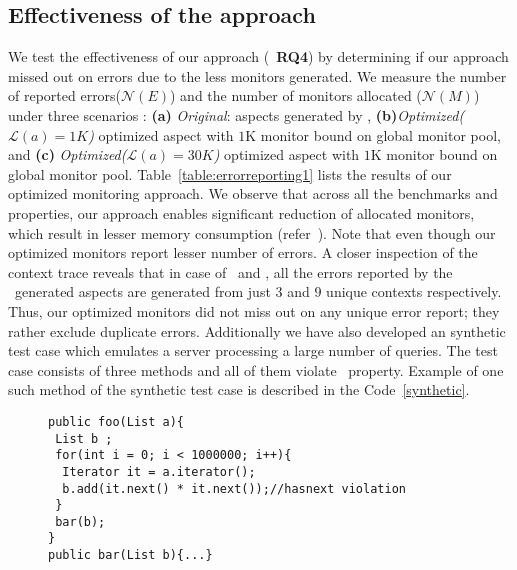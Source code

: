 \subsection{Effectiveness of the approach}
\label{sec:evaluation:effectiveness}


We test the effectiveness of our approach (\ie\ \textbf{RQ4}) by determining 
if our approach missed out on errors due to the less monitors generated. We 
measure the number of reported errors($\mathcal{N}(E)$) and the number of 
monitors allocated ($\mathcal{N}(M)$) under three scenarios : \textbf{(a)}
\emph{Original}: aspects generated by \javamop, 
\textbf{(b)}\emph{Optimized($\mathcal{L}(a) = 1K$)} optimized aspect with $1$K 
monitor bound on global monitor pool, and \textbf{(c)} 
\emph{Optimized($\mathcal{L}(a) = 30K$)} optimized aspect with $1$K monitor
bound on global monitor pool. Table~\ref{table:errorreporting1} lists the 
results of our optimized monitoring approach. We observe that across all the 
benchmarks and properties, our approach enables significant reduction of 
allocated monitors, which result in lesser memory consumption 
(refer~). Note that even though our optimized 
monitors report lesser number of errors. A closer inspection of the context 
trace reveals that in case of \bloat\ and \avrora, all the errors
reported by the \javamop\ generated aspects are generated from just $3$ and $9$ 
unique contexts respectively. Thus, our optimized monitors did not miss out on 
any unique error report; they rather exclude duplicate errors. Additionally we
have also developed an synthetic test case which emulates a server processing a
large number of queries. The test case consists of three methods and all of them
violate \hasnext\ property. Example of one such method of the synthetic test
case is described in the Code~\ref{synthetic}.

\begin{figure}[h]
\begin{lstlisting}
public foo(List a){
 List b ;
 for(int i = 0; i < 1000000; i++){
  Iterator it = a.iterator();
  b.add(it.next() * it.next());//hasnext violation
 }
 bar(b);
}
public bar(List b){...}
\end{lstlisting}
\end{figure}

